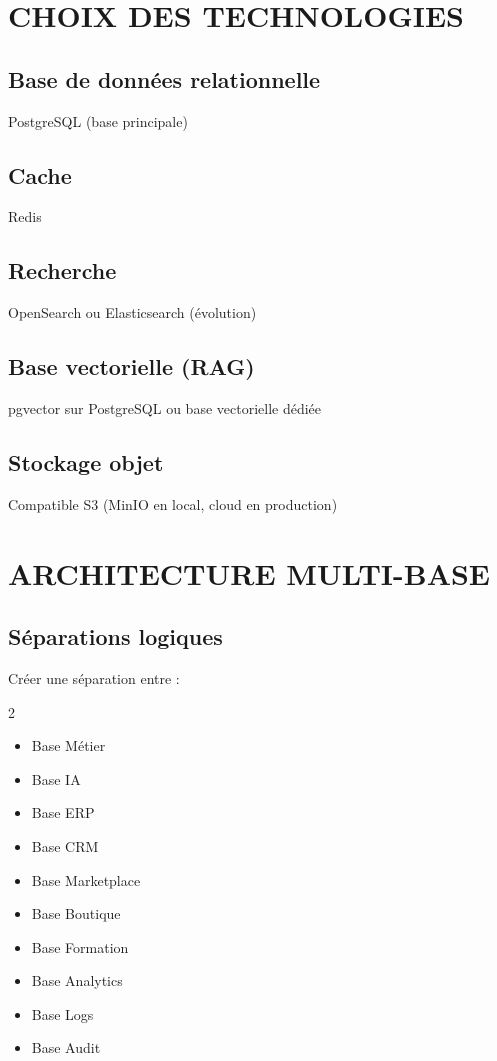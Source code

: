 \documentclass[12pt,a4paper,oneside]{book}
\begin{document}
\chapter{CHOIX DES TECHNOLOGIES}

\section{Base de données relationnelle}
PostgreSQL (base principale)

\section{Cache}
Redis

\section{Recherche}
OpenSearch ou Elasticsearch (évolution)

\section{Base vectorielle (RAG)}
pgvector sur PostgreSQL ou base vectorielle dédiée

\section{Stockage objet}
Compatible S3 (MinIO en local, cloud en production)

\chapter{ARCHITECTURE MULTI-BASE}

\section{Séparations logiques}
Créer une séparation entre :
\begin{multicols}{2}
\begin{itemize}
\item Base Métier
\item Base IA
\item Base ERP
\item Base CRM
\item Base Marketplace
\item Base Boutique
\item Base Formation
\item Base Analytics
\item Base Logs
\item Base Audit
\end{itemize}
\end{multicols}
\end{document}
